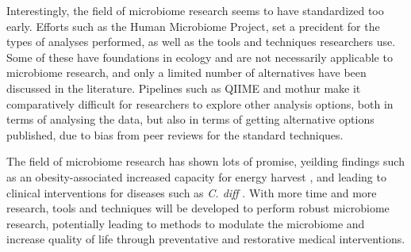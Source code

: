 Interestingly, the field of microbiome research seems to have standardized too early. Efforts such as the Human Microbiome Project, set a precident for the types of analyses performed, as well as the tools and techniques researchers use. Some of these have foundations in ecology and are not necessarily applicable to microbiome research, and only a limited number of alternatives have been discussed in the literature. Pipelines such as QIIME \cite{caporaso2010qiime} and mothur \cite{schloss2009introducing} make it comparatively difficult for researchers to explore other analysis options, both in terms of analysing the data, but also in terms of getting alternative options published, due to bias from peer reviews for the standard techniques.

The field of microbiome research has shown lots of promise, yeilding findings such as an obesity-associated increased capacity for energy harvest \cite{turnbaugh2006obesity}, and leading to clinical interventions for diseases such as \textit{C. diff} \cite{petrof2013stool}. With more time and more research, tools and techniques will be developed to perform robust microbiome research, potentially leading to methods to modulate the microbiome and increase quality of life through preventative and restorative medical interventions.
